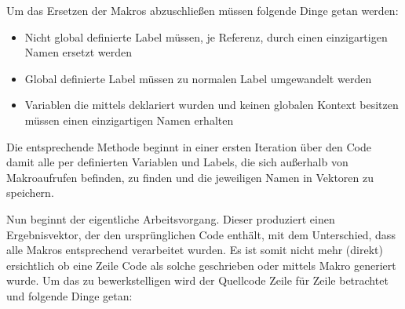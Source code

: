 Um das Ersetzen der Makros abzuschließen müssen folgende Dinge getan werden: 

\begin{itemize}
	\item Nicht global definierte Label müssen, je Referenz, durch einen einzigartigen Namen ersetzt werden
	\item Global definierte Label müssen zu \glqq normalen\grqq{} Label umgewandelt werden
	\item Variablen die mittels  deklariert wurden und keinen globalen Kontext besitzen müssen einen einzigartigen Namen erhalten
\end{itemize}

Die entsprechende Methode beginnt in einer ersten Iteration über den Code damit alle per  definierten Variablen und Labels, die sich außerhalb von Makroaufrufen befinden, zu finden und die jeweiligen Namen in Vektoren zu speichern.

Nun beginnt der eigentliche Arbeitsvorgang. Dieser produziert einen Ergebnisvektor, der den ursprünglichen Code enthält, mit dem Unterschied, dass alle Makros entsprechend verarbeitet wurden. Es ist somit nicht mehr (direkt) ersichtlich ob eine Zeile Code als solche geschrieben oder mittels Makro generiert wurde. Um das zu bewerkstelligen wird der Quellcode Zeile für Zeile betrachtet und folgende Dinge getan:

